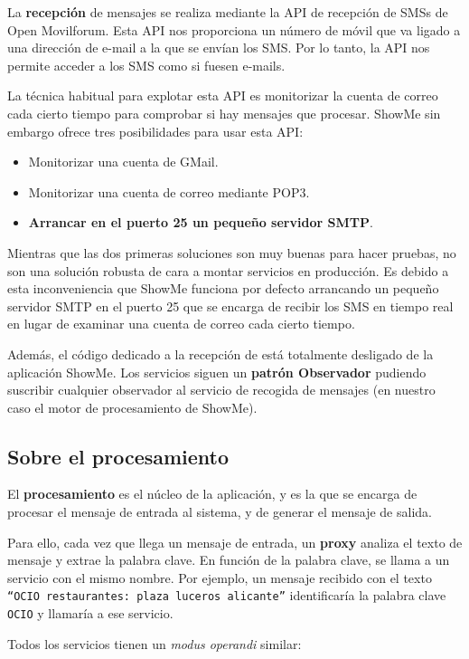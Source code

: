 \documentclass[11pt, a4paper, oneside]{article}
\begin{document}
La \textbf{recepción} de mensajes se realiza mediante la API de recepción de SMSs de Open Movilforum. Esta API nos proporciona un número de móvil que va ligado a una dirección de e-mail a la que se envían los SMS. Por lo tanto, la API nos permite acceder a los SMS como si fuesen e-mails.

La técnica habitual para explotar esta API es monitorizar la cuenta de correo cada cierto tiempo para comprobar si hay mensajes que procesar. ShowMe sin embargo ofrece tres posibilidades para usar esta API:
\begin{itemize}
	\item Monitorizar una cuenta de GMail.
	\item Monitorizar una cuenta de correo mediante POP3.
	\item \textbf{Arrancar en el puerto 25 un pequeño servidor SMTP}.
\end{itemize}

Mientras que las dos primeras soluciones son muy buenas para hacer pruebas, no son una solución robusta de cara a montar servicios en producción. Es debido a esta inconveniencia que ShowMe funciona por defecto arrancando un pequeño servidor SMTP en el puerto 25 que se encarga de recibir los SMS en tiempo real en lugar de examinar una cuenta de correo cada cierto tiempo.

Además, el código dedicado a la recepción de está totalmente desligado de la aplicación ShowMe. Los servicios siguen un \textbf{patrón Observador} pudiendo suscribir cualquier observador al servicio de recogida de mensajes (en nuestro caso el motor de procesamiento de ShowMe).

\subsection{Sobre el procesamiento}

El \textbf{procesamiento} es el núcleo de la aplicación, y es la que se encarga de procesar el mensaje de entrada al sistema, y de generar el mensaje de salida.

Para ello, cada vez que llega un mensaje de entrada, un \textbf{proxy} analiza el texto de mensaje y extrae la palabra clave. En función de la palabra clave, se llama a un servicio con el mismo nombre. Por ejemplo, un mensaje recibido con el texto \texttt{``OCIO restaurantes: plaza luceros alicante''} identificaría la palabra clave \texttt{OCIO} y llamaría a ese servicio.

Todos los servicios tienen un \emph{modus operandi} similar:
\end{document}
